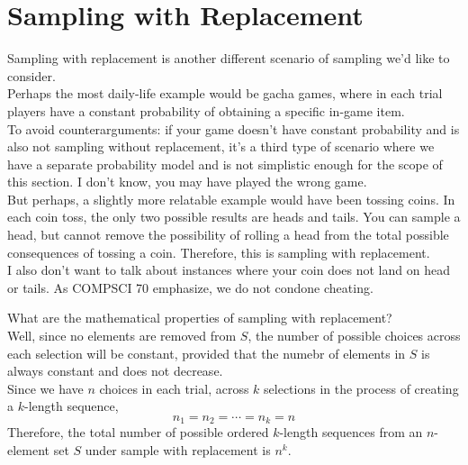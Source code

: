 \section{Sampling with Replacement}
Sampling with replacement is another different scenario of sampling we'd like to consider. \\
Perhaps the most daily-life example would be gacha games, where in each trial players have a constant probability of obtaining a specific in-game item. \\
To avoid counterarguments: if your game doesn't have constant probability and is also not sampling without replacement, it's a third type of scenario where we have a separate probability model and is not simplistic enough for the scope of this section. I don't know, you may have played the wrong game. \\
But perhaps, a slightly more relatable example would have been tossing coins. In each coin toss, the only two possible results are heads and tails. You can sample a head, but cannot remove the possibility of rolling a head from the total possible consequences of tossing a coin. Therefore, this is sampling with replacement. \\
I also don't want to talk about instances where your coin does not land on head or tails. As COMPSCI 70 emphasize, we do not condone cheating.

What are the mathematical properties of sampling with replacement? \\
Well, since no elements are removed from $S$, the number of possible choices across each selection will be constant, provided that the numebr of elements in $S$ is always constant and does not decrease. \\
Since we have $n$ choices in each trial, across $k$ selections in the process of creating a $k$-length sequence, 
\[n_1 = n_2 = \cdots = n_k = n\]
Therefore, the total number of possible ordered $k$-length sequences from an $n$-element set $S$ under sample with replacement is $n^k$.

